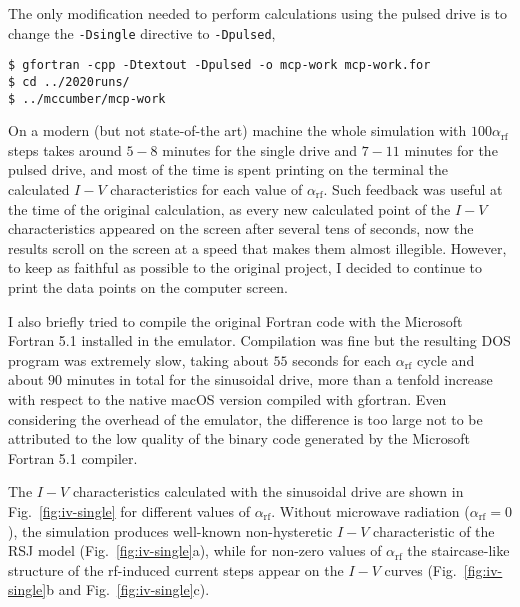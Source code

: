 The only modification needed to perform calculations using the pulsed drive is to change the \texttt{-Dsingle} directive to \texttt{-Dpulsed},

\begin{lstlisting}
$ gfortran -cpp -Dtextout -Dpulsed -o mcp-work mcp-work.for
$ cd ../2020runs/
$ ../mccumber/mcp-work
\end{lstlisting}


On a modern (but not state-of-the art) machine the whole simulation with $100 \alpha_\mathrm{rf}$ steps takes around $5 - 8$ minutes for the single drive and $7 -11$ minutes for the pulsed drive, and most of the time is spent printing on the terminal the calculated $I - V$ characteristics for each value of $\alpha_\mathrm{rf}$. Such feedback was useful at the time of the original calculation, as every new calculated point of the $I - V$ characteristics appeared on the screen after several tens of seconds, now the results scroll on the screen at a speed that makes them almost illegible.
However, to keep as faithful as possible to the original project, I decided to continue to print the data points on the computer screen.

I also briefly tried to compile the original Fortran code with the Microsoft Fortran 5.1 installed in the emulator. Compilation was fine but the resulting DOS program was extremely slow, taking about $55$ seconds for each $\alpha_\mathrm{rf}$ cycle and about $90$ minutes in total for the sinusoidal drive, more than a tenfold increase with respect to the native macOS version compiled with gfortran.
Even considering the overhead of the emulator, the difference is too large not to be attributed to the low quality of the binary code generated by the Microsoft Fortran 5.1 compiler.

The $I - V$ characteristics calculated with the sinusoidal drive are shown in Fig.~\ref{fig:iv-single} for different values of $\alpha_\mathrm{rf}$.
Without microwave radiation ($\alpha_\mathrm{rf} = 0$), the simulation produces well-known non-hysteretic $I - V$ characteristic of the RSJ model (Fig.~\ref{fig:iv-single}a), while for non-zero values of $\alpha_\mathrm{rf}$ the staircase-like structure of the rf-induced current steps appear on the $I - V$ curves (Fig.~\ref{fig:iv-single}b and Fig.~\ref{fig:iv-single}c).


